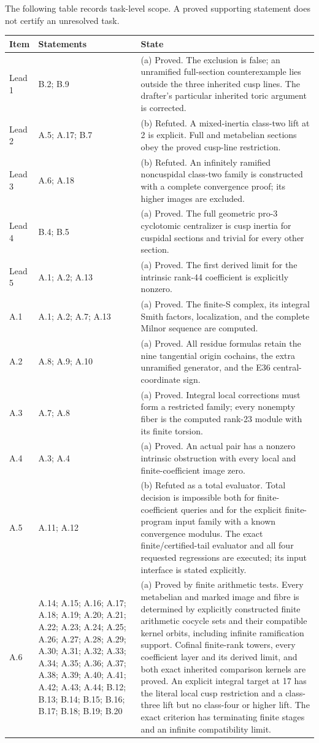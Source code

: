 The following table records task-level scope. A proved supporting statement does not certify an unresolved task.
\begin{longtable}{@{}p{1.1cm}p{3.0cm}p{10.3cm}@{}}
\toprule Item & Statements & State \\ \midrule\endhead
Lead 1 & B.2; B.9 & (a) Proved. The exclusion is false; an unramified full-section counterexample lies outside the three inherited cusp lines. The drafter's particular inherited toric argument is corrected. \\
Lead 2 & A.5; A.17; B.7 & (b) Refuted. A mixed-inertia class-two lift at 2 is explicit. Full and metabelian sections obey the proved cusp-line restriction. \\
Lead 3 & A.6; A.18 & (b) Refuted. An infinitely ramified noncuspidal class-two family is constructed with a complete convergence proof; its higher images are excluded. \\
Lead 4 & B.4; B.5 & (a) Proved. The full geometric pro-3 cyclotomic centralizer is cusp inertia for cuspidal sections and trivial for every other section. \\
Lead 5 & A.1; A.2; A.13 & (a) Proved. The first derived limit for the intrinsic rank-44 coefficient is explicitly nonzero. \\
A.1 & A.1; A.2; A.7; A.13 & (a) Proved. The finite-S complex, its integral Smith factors, localization, and the complete Milnor sequence are computed. \\
A.2 & A.8; A.9; A.10 & (a) Proved. All residue formulas retain the nine tangential origin cochains, the extra unramified generator, and the E36 central-coordinate sign. \\
A.3 & A.7; A.8 & (a) Proved. Integral local corrections must form a restricted family; every nonempty fiber is the computed rank-23 module with its finite torsion. \\
A.4 & A.3; A.4 & (a) Proved. An actual pair has a nonzero intrinsic obstruction with every local and finite-coefficient image zero. \\
A.5 & A.11; A.12 & (b) Refuted as a total evaluator. Total decision is impossible both for finite-coefficient queries and for the explicit finite-program input family with a known convergence modulus. The exact finite/certified-tail evaluator and all four requested regressions are executed; its input interface is stated explicitly. \\
A.6 & A.14; A.15; A.16; A.17; A.18; A.19; A.20; A.21; A.22; A.23; A.24; A.25; A.26; A.27; A.28; A.29; A.30; A.31; A.32; A.33; A.34; A.35; A.36; A.37; A.38; A.39; A.40; A.41; A.42; A.43; A.44; B.12; B.13; B.14; B.15; B.16; B.17; B.18; B.19; B.20 & (a) Proved by finite arithmetic tests. Every metabelian and marked image and fibre is determined by explicitly constructed finite arithmetic cocycle sets and their compatible kernel orbits, including infinite ramification support. Cofinal finite-rank towers, every coefficient layer and its derived limit, and both exact inherited comparison kernels are proved. An explicit integral target at 17 has the literal local cusp restriction and a class-three lift but no class-four or higher lift. The exact criterion has terminating finite stages and an infinite compatibility limit. \\

\end{longtable}
